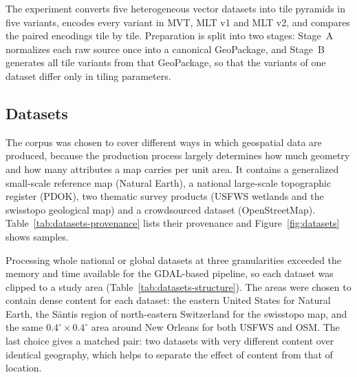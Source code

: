 The experiment converts five heterogeneous vector datasets into tile pyramids in five
variants, encodes every variant in MVT, MLT v1 and MLT v2, and compares the paired
encodings tile by tile. Preparation is
split into two stages: Stage~A normalizes each raw source once into a canonical
GeoPackage, and Stage~B generates all tile variants from that GeoPackage, so that the
variants of one dataset differ only in tiling parameters.

\subsection{Datasets}
\label{sec:data}

The corpus was chosen to cover different ways in which geospatial data are produced,
because the production process largely determines how much geometry and how many
attributes a map carries per unit area. It contains a generalized small-scale reference
map (Natural Earth), a national large-scale topographic register (PDOK), two thematic
survey products (USFWS wetlands and the swisstopo geological map) and a crowdsourced
dataset (OpenStreetMap). Table~\ref{tab:datasets-provenance} lists their provenance and
Figure~\ref{fig:datasets} shows samples.

Processing whole national or global datasets at three granularities exceeded the memory
and time available for the GDAL-based pipeline, so each dataset was clipped to a study
area (Table~\ref{tab:datasets-structure}). The areas were chosen to contain dense content
for each dataset: the eastern United States for Natural Earth, the Säntis region of
north-eastern Switzerland for the swisstopo map, and the same $0.4^\circ\times0.4^\circ$
area around New Orleans for both USFWS and OSM. The last choice gives a matched pair: two
datasets with very different content over identical geography, which helps to separate
the effect of content from that of location.


